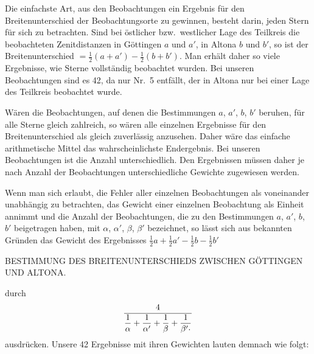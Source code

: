 Die einfachste Art, aus den Beobachtungen ein Ergebnis für den
Breitenunterschied der Beobachtungsorte zu gewinnen, besteht darin, jeden Stern
für sich zu betrachten. Sind bei östlicher bzw.\ westlicher Lage des Teilkreis
die beobachteten Zenitdistanzen in Göttingen $a$ und $a'$, in Altona $b$ und $b'$, so
ist der Breitenunterschied $=\frac12(a+a')-\frac12(b+b')$. Man erhält daher so
viele Ergebnisse, wie Sterne vollständig beobachtet wurden. Bei unseren Beobachtungen sind es
42, da nur Nr.\ 5 entfällt, der in Altona nur bei einer Lage des Teilkreis beobachtet wurde.

Wären die Beobachtungen, auf denen die Bestimmungen $a$, $a'$, $b$, $b'$ beruhen,
für alle Sterne gleich zahlreich, so wären alle einzelnen Ergebnisse
für den Breitenunterschied als gleich zuverlässig anzusehen. Daher wäre das
einfache arithmetische Mittel das wahrscheinlichste Endergebnis. Bei
unseren Beobachtungen ist die Anzahl unterschiedlich. Den Ergebnissen müssen
daher je nach Anzahl der Beobachtungen unterschiedliche
Gewichte zugewiesen werden.

Wenn man sich erlaubt, die Fehler aller einzelnen Beobachtungen als
voneinander unabhängig zu betrachten, das Gewicht einer einzelnen Beobachtung
als Einheit annimmt und die Anzahl der Beobachtungen, die zu
den Bestimmungen $a$, $a'$, $b$, $b'$ beigetragen haben, mit $\alpha$, $\alpha'$, $\beta$, $\beta'$ bezeichnet, so
lässt sich aus bekannten Gründen das Gewicht des Ergebnisses $\frac12a+\frac12a'-\frac12b-\frac12b'$

\clearpage
\noindent{}\parbox[t]{\dimexpr\textwidth-10mm\relax}{\centering\scriptsize BESTIMMUNG DES BREITENUNTERSCHIEDS ZWISCHEN GÖTTINGEN UND ALTONA.}\par

\noindent durch
\[
\frac{4}{\dfrac1\alpha+\dfrac1{\alpha'}+\dfrac1\beta+\dfrac1{\beta'\mathord{\text{\raisebox{.3ex}{.}}}}}
\]
ausdrücken. Unsere 42 Ergebnisse mit ihren Gewichten lauten demnach
wie folgt:

